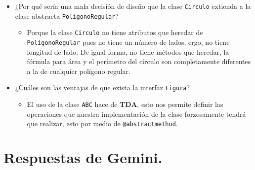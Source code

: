 \documentclass[12pt, letterpaper]{article}
\begin{document}
\begin{itemize}
  \item ¿Por qué sería una mala decisión de diseño que la clase \texttt{Circulo} extienda a la clase abstracta \texttt{PolígonoRegular}?
    \begin{itemize}
      \item Porque la clase \texttt{Circulo} no tiene atributos que heredar de \texttt{PolígonoRegular} pues no tiene un número de lados, ergo, no tiene longitud de lado. De igual forma, no tiene métodos que heredar, la fórmula para área y el perímetro
        del círculo son completamente diferentes a la de cualquier polígono regular.
    \end{itemize}
  \item ¿Cuáles son las ventajas de que exista la interfaz \texttt{Figura}?
    \begin{itemize}
      \item El uso de la clase \texttt{ABC} hace de \textbf{TDA}, esto nos permite definir las operaciones que nuestra implementación
        de la clase forzosamente tendrá que realizar, esto por medio de \texttt{@abstractmethod}.
    \end{itemize}
\end{itemize}

\section{Respuestas de Gemini.}
\end{document}
